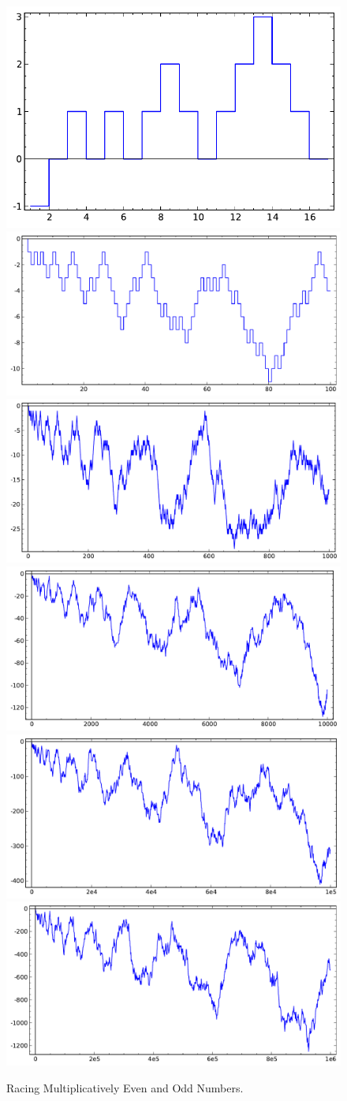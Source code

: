 \documentclass[openany]{book}
\theoremstyle{plain}
\theoremstyle{definition}
\begin{document}
 \begin{figure}[H]
\centering
\includegraphics[width=.4\textwidth]{illustrations/liouville-17}
\includegraphics[width=.4\textwidth]{illustrations/liouville-100}\\
\includegraphics[width=.4\textwidth]{illustrations/liouville-1000}
\includegraphics[width=.4\textwidth]{illustrations/liouville-10000}\\
\includegraphics[width=.4\textwidth]{illustrations/liouville-100000}
\includegraphics[width=.4\textwidth]{illustrations/liouville-1000000}\\
\caption{Racing Multiplicatively Even and Odd Numbers.\label{fig:liouville}}
\end{figure}
\end{document}
